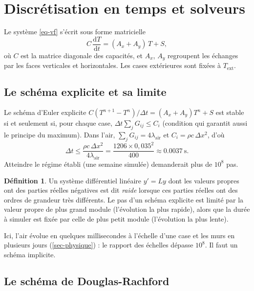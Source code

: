 \documentclass[11pt,a4paper]{article}
\theoremstyle{definition}
\newtheorem{definition}{Définition}
\theoremstyle{remark}
\newcommand{\dx}{\Delta x}
\newcommand{\dt}{\Delta t}
\newcommand{\Text}{T_{\mathrm{ext}}}
\newcommand{\la}{\lambda_{\mathrm{air}}}
\begin{document}
\section{Discrétisation en temps et solveurs}\label{sec-temps}

Le système \eqref{eq-vf} s'écrit sous forme matricielle
\begin{equation}\label{eq-matriciel}
C\,\frac{\mathrm{d}T}{\mathrm{d}t} = (A_x + A_y)\,T + S,
\end{equation}
où $C$ est la matrice diagonale des capacités, et $A_x$, $A_y$ regroupent les échanges
par les faces verticales et horizontales. Les cases extérieures sont fixées à
$\Text$.

\subsection{Le schéma explicite et sa limite}

Le schéma d'Euler explicite $C(T^{n+1}-T^n)/\dt = (A_x+A_y)T^n + S$ est stable si
et seulement si, pour chaque case, $\dt\sum_j G_{ij} \le C_i$ (condition qui
garantit aussi le principe du maximum). Dans l'air,
$\sum_j G_{ij} = 4\la$ et $C_i = \rho c\,\dx^2$, d'où
\[
\dt \le \frac{\rho c\,\dx^2}{4\la} = \frac{1206\times0,035^2}{400}\approx\qty{0,0037}{\second}.
\]
Atteindre le régime établi (une semaine simulée) demanderait plus de $10^8$ pas.

\begin{definition}
Un système différentiel linéaire $y' = Ly$ dont les valeurs propres ont des parties
réelles négatives est dit \emph{raide} lorsque ces parties réelles ont des ordres de
grandeur très différents. Le pas d'un schéma explicite est limité par la valeur
propre de plus grand module (l'évolution la plus rapide), alors que la durée à
simuler est fixée par celle de plus petit module (l'évolution la plus lente).
\end{definition}

Ici, l'air évolue en quelques millisecondes à l'échelle d'une case et les murs en
plusieurs jours (\cref{sec-physique}) : le rapport des échelles dépasse $10^8$. Il
faut un schéma implicite.

\subsection{Le schéma de Douglas-Rachford}
\end{document}
